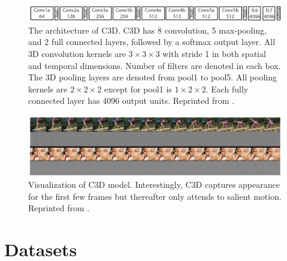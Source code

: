 \begin{figure}
	\includegraphics[width=\linewidth]{figs/3DConvNet.png}
	\caption{The architecture of C3D. C3D has 8 convolution, 5 max-pooling, and 2 full connected layers, followed by a softmax output layer. All 3D convolution kernels are \(3 \times 3 \times 3\) with stride 1 in both spatial and temporal dimensions. Number of filters are denoted in each box. The 3D pooling layers are denoted from pool1 to pool5. All pooling kernels are \(2 \times 2 \times 2\) except for pool1 is \(1 \times 2 \times 2\). Each fully connected layer has 4096 output units. Reprinted from \cite{Tran2015}.}
	\label{fig:3DConvNet}
\end{figure}

\begin{figure}
	\includegraphics[width=\linewidth]{figs/3DConvNetV.png}
	\caption{Visualization of C3D model. Interestingly, C3D captures appearance for the first few frames but thereafter only attends to salient motion. Reprinted from \cite{Tran2015}.}
	\label{fig:3DConvNetV}
\end{figure}

\section{Datasets}
\label{2_4}

